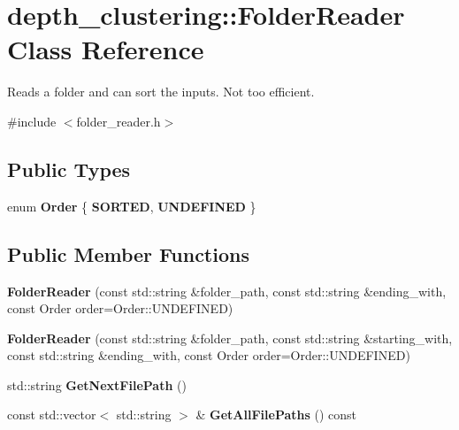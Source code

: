\hypertarget{classdepth__clustering_1_1FolderReader}{}\section{depth\+\_\+clustering\+:\+:Folder\+Reader Class Reference}
\label{classdepth__clustering_1_1FolderReader}


Reads a folder and can sort the inputs. Not too efficient.  




{\ttfamily \#include $<$folder\+\_\+reader.\+h$>$}

\subsection*{Public Types}
\begin{DoxyCompactItemize}
\item 
\mbox{\label{classdepth__clustering_1_1FolderReader_ab4a3a1cf87192b779ada139a1a00c12a}} 
enum {\bfseries Order} \{ {\bfseries S\+O\+R\+T\+ED}, 
{\bfseries U\+N\+D\+E\+F\+I\+N\+ED}
 \}
\end{DoxyCompactItemize}
\subsection*{Public Member Functions}
\begin{DoxyCompactItemize}
\item 
\mbox{\label{classdepth__clustering_1_1FolderReader_a80ae7f477c0ba4ca20e58e0eff0874b2}} 
{\bfseries Folder\+Reader} (const std\+::string \&folder\+\_\+path, const std\+::string \&ending\+\_\+with, const Order order=Order\+::\+U\+N\+D\+E\+F\+I\+N\+ED)
\item 
\mbox{\label{classdepth__clustering_1_1FolderReader_a298f7b246759d1d926746e057c9d96a0}} 
{\bfseries Folder\+Reader} (const std\+::string \&folder\+\_\+path, const std\+::string \&starting\+\_\+with, const std\+::string \&ending\+\_\+with, const Order order=Order\+::\+U\+N\+D\+E\+F\+I\+N\+ED)
\item 
\mbox{\label{classdepth__clustering_1_1FolderReader_aeb4575a662afa48264fec96f4802db90}} 
std\+::string {\bfseries Get\+Next\+File\+Path} ()
\item 
\mbox{\label{classdepth__clustering_1_1FolderReader_a463cb6564efbad7d6b3000775ba93292}} 
const std\+::vector$<$ std\+::string $>$ \& {\bfseries Get\+All\+File\+Paths} () const
\end{DoxyCompactItemize}
